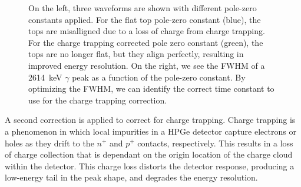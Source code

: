 \documentclass[/main.tex]{subfiles}
\begin{document}
\begin{figure}
  \centering
  \caption[Charge Trapping Correction]{\label{fig:ctcorr}
    On the left, three waveforms are shown with different pole-zero constants applied. For the flat top pole-zero constant (blue), the tops are misalligned due to a loss of charge from charge trapping. For the charge trapping corrected pole zero constant (green), the tops are no longer flat, but they align perfectly, resulting in improved energy resolution. On the right, we see the FWHM of a 2614~keV $\gamma$ peak as a function of the pole-zero constant. By optimizing the FWHM, we can identify the correct time constant to use for the charge trapping correction. 
  }
\end{figure}
A second correction is applied to correct for charge trapping.
Charge trapping is a phenomenon in which local impurities in a HPGe detector capture electrons or holes as they drift to the $n^+$ and $p^+$ contacts, respectively.
This results in a loss of charge collection that is dependant on the origin location of the charge cloud within the detector.
This charge loss distorts the detector response, producing a low-energy tail in the peak shape, and degrades the energy resolution.
\end{document}
